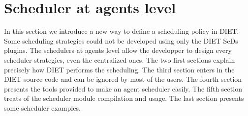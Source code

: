 

%
\section{Scheduler at agents level}
In this section we introduce a new way to define a scheduling policy in DIET.
Some scheduling strategies could not be developed using only the DIET SeDs
plugins. The schedulers at agents level allow the developper to design every
scheduler strategies, even the centralized ones. The two first sections
explain precisely how DIET performs the scheduling. The third section enters
in the DIET source code and can be ignored by most of the users. The
fourth section presents the tools provided to make an agent scheduler
easily. The fifth section treats of the scheduler module compilation and
usage. The last section presents some scheduler examples.
